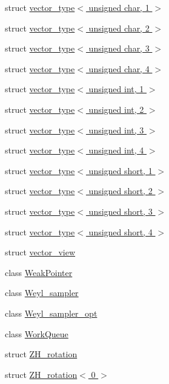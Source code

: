 \begin{DoxyCompactItemize}
\item 
struct \hyperlink{structcugar_1_1vector__type_3_01unsigned_01char_00_011_01_4}{vector\+\_\+type$<$ unsigned char, 1 $>$}
\item 
struct \hyperlink{structcugar_1_1vector__type_3_01unsigned_01char_00_012_01_4}{vector\+\_\+type$<$ unsigned char, 2 $>$}
\item 
struct \hyperlink{structcugar_1_1vector__type_3_01unsigned_01char_00_013_01_4}{vector\+\_\+type$<$ unsigned char, 3 $>$}
\item 
struct \hyperlink{structcugar_1_1vector__type_3_01unsigned_01char_00_014_01_4}{vector\+\_\+type$<$ unsigned char, 4 $>$}
\item 
struct \hyperlink{structcugar_1_1vector__type_3_01unsigned_01int_00_011_01_4}{vector\+\_\+type$<$ unsigned int, 1 $>$}
\item 
struct \hyperlink{structcugar_1_1vector__type_3_01unsigned_01int_00_012_01_4}{vector\+\_\+type$<$ unsigned int, 2 $>$}
\item 
struct \hyperlink{structcugar_1_1vector__type_3_01unsigned_01int_00_013_01_4}{vector\+\_\+type$<$ unsigned int, 3 $>$}
\item 
struct \hyperlink{structcugar_1_1vector__type_3_01unsigned_01int_00_014_01_4}{vector\+\_\+type$<$ unsigned int, 4 $>$}
\item 
struct \hyperlink{structcugar_1_1vector__type_3_01unsigned_01short_00_011_01_4}{vector\+\_\+type$<$ unsigned short, 1 $>$}
\item 
struct \hyperlink{structcugar_1_1vector__type_3_01unsigned_01short_00_012_01_4}{vector\+\_\+type$<$ unsigned short, 2 $>$}
\item 
struct \hyperlink{structcugar_1_1vector__type_3_01unsigned_01short_00_013_01_4}{vector\+\_\+type$<$ unsigned short, 3 $>$}
\item 
struct \hyperlink{structcugar_1_1vector__type_3_01unsigned_01short_00_014_01_4}{vector\+\_\+type$<$ unsigned short, 4 $>$}
\item 
struct \hyperlink{structcugar_1_1vector__view}{vector\+\_\+view}
\item 
class \hyperlink{classcugar_1_1_weak_pointer}{Weak\+Pointer}
\item 
class \hyperlink{classcugar_1_1_weyl__sampler}{Weyl\+\_\+sampler}
\item 
class \hyperlink{classcugar_1_1_weyl__sampler__opt}{Weyl\+\_\+sampler\+\_\+opt}
\item 
class \hyperlink{classcugar_1_1_work_queue}{Work\+Queue}
\item 
struct \hyperlink{structcugar_1_1_z_h__rotation}{Z\+H\+\_\+rotation}
\item 
struct \hyperlink{structcugar_1_1_z_h__rotation_3_010_01_4}{Z\+H\+\_\+rotation$<$ 0 $>$}
\end{DoxyCompactItemize}
